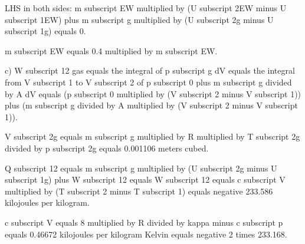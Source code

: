 LHS in both sides:  
m subscript EW multiplied by (U subscript 2EW minus U subscript 1EW) plus m subscript g multiplied by (U subscript 2g minus U subscript 1g) equals 0.  

m subscript EW equals 0.4 multiplied by m subscript EW.  

c)  
W subscript 12 gas equals the integral of p subscript g dV equals the integral from V subscript 1 to V subscript 2 of p subscript 0 plus m subscript g divided by A dV equals (p subscript 0 multiplied by (V subscript 2 minus V subscript 1)) plus (m subscript g divided by A multiplied by (V subscript 2 minus V subscript 1)).  

V subscript 2g equals m subscript g multiplied by R multiplied by T subscript 2g divided by p subscript 2g equals 0.001106 meters cubed.  

Q subscript 12 equals m subscript g multiplied by (U subscript 2g minus U subscript 1g) plus W subscript 12 equals W subscript 12 equals c subscript V multiplied by (T subscript 2 minus T subscript 1) equals negative 233.586 kilojoules per kilogram.  

c subscript V equals 8 multiplied by R divided by kappa minus c subscript p equals 0.46672 kilojoules per kilogram Kelvin equals negative 2 times 233.168.